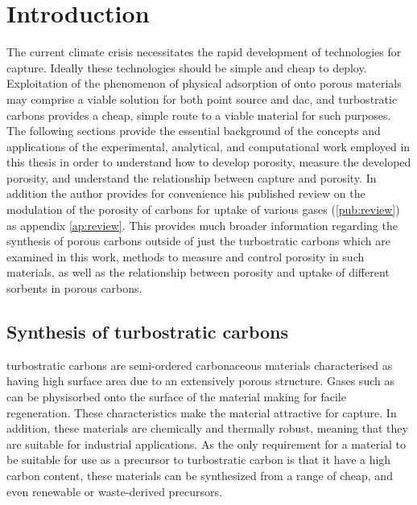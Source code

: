 \chapter{Introduction}
\label{ch:introduction}
The current climate crisis necessitates the rapid development of technologies for  capture. Ideally these technologies should be simple and cheap to deploy. Exploitation of the phenomenon of physical adsorption of  onto porous materials may comprise a viable solution for both point source and \acrfull{dac}, and \glspl{turbostratic carbon} provides a cheap, simple route to a viable material for such purposes. The following sections provide the essential background of the concepts and applications of the experimental, analytical, and computational work employed in this thesis in order to understand how to develop porosity, measure the developed porosity, and understand the relationship between  capture and porosity. In addition the author provides for convenience his published review on the modulation of the porosity of carbons for uptake of various gases (\ref{pub:review}) as appendix \ref{ap:review}. This provides much broader information regarding the synthesis of porous carbons outside of just the \glspl{turbostratic carbon} which are examined in this work, methods to measure and control porosity in such materials, as well as the relationship between porosity and uptake of different sorbents in porous carbons. 

\newpage

\section{Synthesis of turbostratic carbons}

\Glspl{turbostratic carbon} are semi-ordered carbonaceous materials characterised as having high surface area due to an extensively porous structure. Gases such as  can be physisorbed onto the surface of the material making for facile regeneration.\citep{Kuramochi2012Comparative, Ghosh2016} These characteristics make the material attractive for  capture. In addition, these materials are chemically and thermally robust, meaning that they are suitable for industrial applications.\citep{Kuramochi2012Comparative, Coromina2016, HaffnerStaton2016High} As the only requirement for a material to be suitable for use as a precursor to \gls{turbostratic carbon} is that it have a high carbon content, these materials can be  synthesized  from a  range  of cheap, and even renewable or waste-derived precursors.\citep{Sevilla2014Energy, Sun2017, Titirici2010Chemistry, Blankenship2017Cigarette, Ariharan2018}

